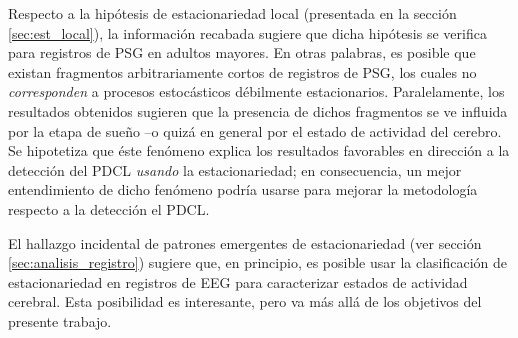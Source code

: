 \documentclass[12pt,letterpaper,draft]{book}
\begin{document}
Respecto a la hipótesis de estacionariedad local (presentada en la sección \ref{sec:est_local}), la información recabada sugiere que dicha hipótesis se verifica para registros de PSG en adultos mayores.
%
En otras palabras, es posible que existan fragmentos arbitrariamente cortos de registros de PSG, los cuales no \textit{corresponden} a procesos estocásticos débilmente estacionarios.
%
Paralelamente, los resultados obtenidos sugieren que la presencia de dichos fragmentos se ve influida por la etapa de sueño --o quizá en general por el estado de actividad del cerebro.
%
Se hipotetiza que éste fenómeno explica los resultados {favorables} en dirección a la detección del PDCL \textit{usando} la estacionariedad; en consecuencia, un mejor entendimiento de dicho fenómeno podría usarse para mejorar la metodología respecto a la detección el PDCL.
%



El hallazgo incidental de patrones emergentes de estacionariedad (ver sección \ref{sec:analisis_registro}) sugiere que, en principio, es posible usar la clasificación de estacionariedad en registros de EEG para caracterizar estados de actividad cerebral. 
%
%
Esta posibilidad es interesante, pero va más allá de los objetivos del presente trabajo.
 

\end{document}
